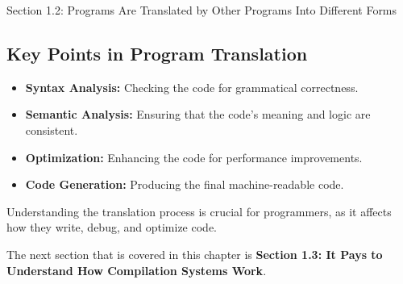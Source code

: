 \begin{notes}{Section 1.2: Programs Are Translated by Other Programs Into Different Forms}
    \subsection*{Key Points in Program Translation}

    \begin{itemize}
        \item \textbf{Syntax Analysis:} Checking the code for grammatical correctness.
        \item \textbf{Semantic Analysis:} Ensuring that the code's meaning and logic are consistent.
        \item \textbf{Optimization:} Enhancing the code for performance improvements.
        \item \textbf{Code Generation:} Producing the final machine-readable code.
    \end{itemize}
    
    Understanding the translation process is crucial for programmers, as it affects how they write, debug, and optimize code.    
\end{notes}

The next section that is covered in this chapter is \textbf{Section 1.3: It Pays to Understand How Compilation Systems Work}.

